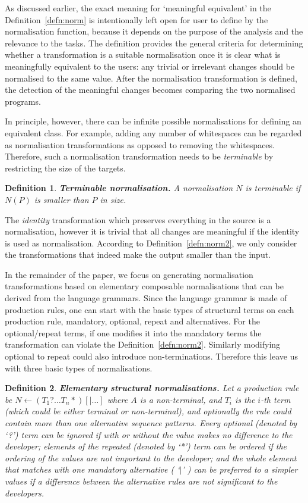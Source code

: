 \documentclass[10pt, conference, compsocconf]{IEEEtran}
\newtheorem{definition}{Definition}
\begin{document}
As discussed earlier, the exact meaning for `meaningful equivalent' in  the Definition~\ref{defn:norm} is intentionally left open for user to define by the normalisation function, because it depends on the purpose of the analysis and the relevance to the tasks. The definition provides the general criteria for determining whether a transformation is a suitable normalisation once it is clear what is meaningfully equivalent to the users: any trivial or irrelevant changes should be normalised to the same value. After the normalisation transformation is defined, the detection of the meaningful changes becomes comparing the two normalised programs. 

In principle, however, there can be infinite possible normalisations for defining an equivalent class. For example, adding any number of whitespaces can be regarded as normalisation transformations as opposed to removing the whitespaces. 
Therefore, such a normalisation transformation needs to be {\em terminable} by restricting the size of the targets.
\begin{definition}
{\bf Terminable normalisation.\label{defn:norm2}} A normalisation $N$ is {\em terminable} if $N(P)$ is smaller than $P$ in size.
\end{definition}
The {\em identity} transformation which preserves everything in the source is a normalisation, however it is trivial that all changes are meaningful if the identity is used as normalisation. According to Definition~\ref{defn:norm2}, we only consider the transformations that indeed make the output smaller than the input.

In the remainder of the paper, we focus on generating normalisation transformations based on elementary composable normalisations that can be derived from the language grammars. Since the language grammar is made of production rules,
one can start with the basic types of structural terms on each production rule, mandatory, optional, repeat and alternatives. For the optional/repeat terms, if one modifies it into the mandatory terms the transformation can violate the Definition~\ref{defn:norm2}. Similarly modifying optional to repeat could also introduce non-terminations. Therefore this leave us with three basic types of normalisations.
\begin{definition}
{\bf Elementary structural normalisations.\label{defn:norm3}} Let a production rule be $N \leftarrow (T_1? \ldots T_n*) [| \ldots] $ where $A$ is a non-terminal, and $T_i$ is the $i$-th term (which could be either terminal or non-terminal), and optionally the rule could contain more than one alternative sequence patterns. Every optional (denoted by `?') term can be {\em ignored} if with or without the value makes no difference to the developer; elements of the repeated (denoted by `*') term can be {\em ordered} if the ordering of the values are not important to the developer; and the whole element that matches with one mandatory alternative ( `$|$' )  can be {\em preferred} to a simpler values if a difference between the alternative rules are not significant to the developers.
\end{definition}
\end{document}
